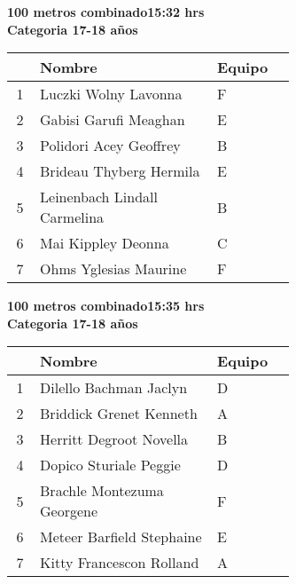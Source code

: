\begin{minipage}{0.95\linewidth}\vspace{0.5cm} 
\begin{flushleft}
\textbf{
\hspace{-0.15cm}100 metros combinado\hspace{1.5cm}15:32 hrs \\Categoria 17-18 años}\vspace{-0.2cm} 
\end{flushleft}
\begin{tabular}{cp{0.63\linewidth}l}
\hline
& \textbf{Nombre} & \textbf{Equipo} \\ \hline
1 & Luczki Wolny Lavonna & F \\ 
2 & Gabisi Garufi Meaghan & E \\ 
3 & Polidori Acey Geoffrey & B \\ 
4 & Brideau Thyberg Hermila & E \\ 
5 & Leinenbach Lindall Carmelina & B \\ 
6 & Mai Kippley Deonna & C \\ 
7 & Ohms Yglesias Maurine & F \\ 
\end{tabular}
\end{minipage}
\begin{minipage}{0.95\linewidth}\vspace{0.5cm} 
\begin{flushleft}
\textbf{
\hspace{-0.15cm}100 metros combinado\hspace{1.5cm}15:35 hrs \\Categoria 17-18 años}\vspace{-0.2cm} 
\end{flushleft}
\begin{tabular}{cp{0.63\linewidth}l}
\hline
& \textbf{Nombre} & \textbf{Equipo} \\ \hline
1 & Dilello Bachman Jaclyn & D \\ 
2 & Briddick Grenet Kenneth & A \\ 
3 & Herritt Degroot Novella & B \\ 
4 & Dopico Sturiale Peggie & D \\ 
5 & Brachle Montezuma Georgene & F \\ 
6 & Meteer Barfield Stephaine & E \\ 
7 & Kitty Francescon Rolland & A \\ 
\end{tabular}
\end{minipage}
